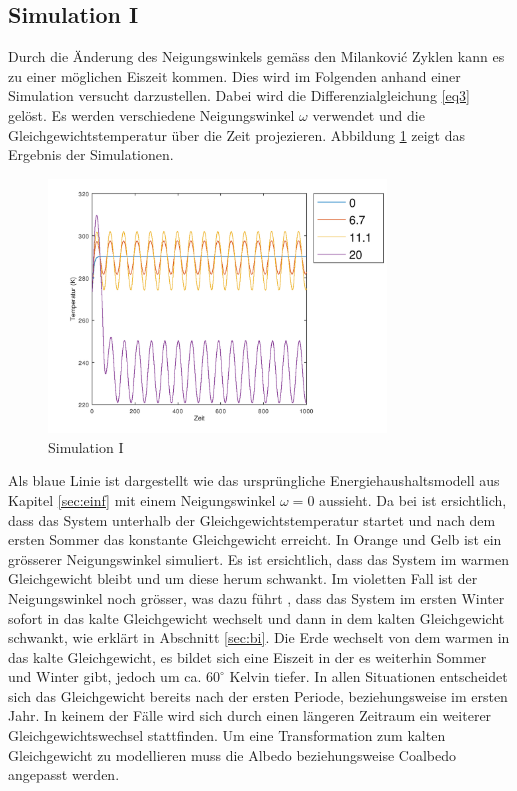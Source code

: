 \begin{refsection}
\subsection{Simulation I} \label{sec:sim1} 
Durch die Änderung des Neigungswinkels gemäss den Milankovi\'c Zyklen kann es zu einer möglichen Eiszeit kommen. Dies wird im Folgenden anhand einer Simulation versucht darzustellen. Dabei wird die Differenzialgleichung \eqref{eq3} gelöst. Es werden verschiedene Neigungswinkel $\omega$ verwendet und die Gleichgewichtstemperatur über die Zeit projezieren. Abbildung \ref{fig:abb9} zeigt das Ergebnis der Simulationen. 
%
\begin{figure}
	\centering
	\includegraphics[width= 0.8\textwidth]{Zeitachse_0.png}
	\caption[Simulation I]{Simulation I}
	\label{fig:abb9}
\end{figure}
%
Als blaue Linie ist dargestellt wie das ursprüngliche Energiehaushaltsmodell aus Kapitel \ref{sec:einf} mit einem Neigungswinkel $\omega=0$ aussieht. Da bei ist ersichtlich, dass das System unterhalb der Gleichgewichtstemperatur startet und nach dem ersten Sommer das konstante Gleichgewicht erreicht. In Orange und Gelb ist ein grösserer Neigungswinkel simuliert. Es ist ersichtlich, dass das System im warmen Gleichgewicht bleibt und um diese herum schwankt. Im violetten Fall ist der Neigungswinkel noch grösser, was dazu führt , dass das System im ersten Winter sofort in das kalte Gleichgewicht wechselt und dann in dem kalten Gleichgewicht schwankt, wie erklärt in Abschnitt \ref{sec:bi}. Die Erde wechselt von dem warmen in das kalte Gleichgewicht, es bildet sich eine Eiszeit in der es weiterhin Sommer und Winter gibt, jedoch um ca. $60 ^\circ$ Kelvin tiefer. 
In allen Situationen entscheidet sich das Gleichgewicht bereits nach der ersten Periode, beziehungsweise im ersten Jahr. In keinem der Fälle wird sich durch einen längeren Zeitraum ein weiterer Gleichgewichtswechsel stattfinden. Um eine Transformation zum kalten Gleichgewicht zu modellieren muss die Albedo beziehungsweise Coalbedo angepasst werden. 



\end{refsection}
